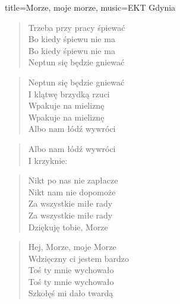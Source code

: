 \begin{song}{title={Morze, moje morze}, music={EKT Gdynia}}
\begin{multicols}{2}
\begin{verse}
        Trzeba przy pracy śpiewać \\
        Bo kiedy śpiewu nie ma \\
        Bo kiedy śpiewu nie ma \\
        Neptun się będzie gniewać
    \end{verse}
    \begin{verse}
        Neptun się będzie gniewać \\
        I klątwę brzydką rzuci \\
        Wpakuje na mieliznę \\
        Wpakuje na mieliznę \\
        Albo nam łódź wywróci
    \end{verse}
    \begin{verse}
        Albo nam łódź wywróci \\
        I krzyknie: 
    \end{verse}
    \begin{verse}
        Nikt po nas nie zapłacze \\
        Nikt nam nie dopomoże \\
        Za wszystkie miłe rady \\
        Za wszystkie miłe rady \\
        Dziękuję tobie, Morze
    \end{verse}
    \begin{verse}
        Hej, Morze, moje Morze \\
        Wdzięczny ci jestem bardzo \\
        Toś ty mnie wychowało \\
        Toś ty mnie wychowało \\
        Szkołęś mi dało twardą
    \end{verse}
    \end{multicols}
\end{song}

